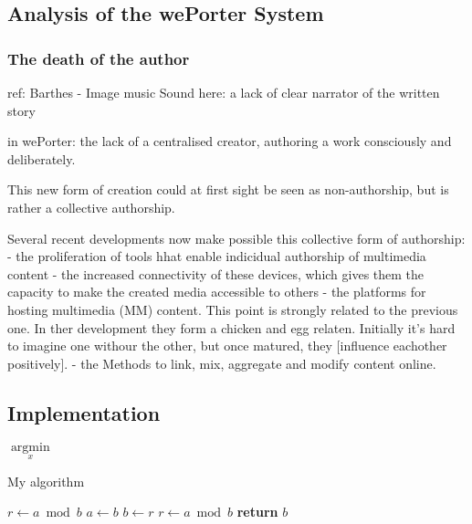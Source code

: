 \documentclass[11pt, a4paper]{report}
\begin{document}
\subsection{Analysis of the wePorter System}

\subsubsection{The death of the author}
ref: Barthes - Image music Sound
here: a lack of clear narrator of the written story

in wePorter: the lack of a centralised creator, authoring a work consciously and deliberately.

This new form of creation could at first sight be seen as non-authorship, but is rather a collective authorship. 

Several recent developments now make possible this collective form of authorship:
- the proliferation of tools hhat enable indicidual authorship of multimedia content
- the increased connectivity of these devices, which gives them the capacity to make the created media accessible to others
- the platforms for hosting multimedia (MM) content. This point is strongly related to the previous one. In ther development they form a chicken and egg relaten. Initially it's hard to imagine one withour the other, but once matured, they [influence eachother positively].
- the Methods to link, mix, aggregate and modify content online.


\label{sec:weporter}
\subsection{Implementation}
\label{sec:implementation}

$\underset{x}{\operatorname{argmin}}$

\begin{algorithm}
  \caption{My algorithm}
  \begin{algorithmic}[1]
      \State $r\gets a\bmod b$
        \State $a\gets b$
        \State $b\gets r$
        \State $r\gets a\bmod b$
      \EndWhile\label{euclidendwhile}
      \State \textbf{return} $b$
    \EndProcedure

  \end{algorithmic}
\end{algorithm}
\end{document}
